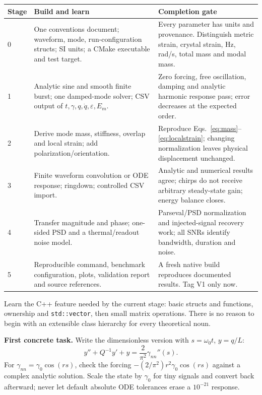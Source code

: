 \documentclass[a4paper,11pt]{article}
\newcommand{\eps}{\varepsilon}
\newcommand{\code}[1]{\texttt{#1}}
\begin{document}
\begin{longtable}{@{}P{17mm}P{62mm}P{74mm}@{}}
\toprule
Stage & Build and learn & Completion gate\\\midrule{} & One conventions document; waveform, mode, run-configuration structs; SI units; a CMake executable and test target. & Every parameter has units and provenance. Distinguish metric strain, crystal strain, Hz, rad/s, total mass and modal mass.\\
1 & Analytic sine and smooth finite burst; one damped-mode solver; CSV output of $t,\gamma,q,\dot q,\eps,E_m$. & Zero forcing, free oscillation, damping and analytic harmonic response pass; error decreases at the expected order.\\
2 & Derive mode mass, stiffness, overlap and local strain; add polarization/orientation. & Reproduce Eqs.~\eqref{eq:mass}--\eqref{eq:localstrain}; changing normalization leaves physical displacement unchanged.\\
3 & Finite waveform convolution or ODE response; ringdown; controlled CSV import. & Analytic and numerical results agree; chirps do not receive arbitrary steady-state gain; energy balance closes.\\
4 & Transfer magnitude and phase; one-sided PSD and a thermal/readout noise model. & Parseval/PSD normalization and injected-signal recovery work; all SNRs identify bandwidth, duration and noise.\\
5 & Reproducible command, benchmark configuration, plots, validation report and source references. & A fresh native build reproduces documented results. Tag V1 only now.\\
\bottomrule
\end{longtable}

Learn the C++ feature needed by the current stage: basic structs and functions, ownership and \code{std::vector}, then small matrix operations. There is no reason to begin with an extensible class hierarchy for every theoretical noun.

\textbf{First concrete task.} Write the dimensionless version with $s=\omega_0t$, $y=q/L$:
\begin{equation}
 y''+Q^{-1}y'+y=\frac2{\pi^2}\gamma_{nn}''(s).
\end{equation}
For $\gamma_{nn}=\gamma_0\cos(rs)$, check the forcing
$-(2/\pi^2)r^2\gamma_0\cos(rs)$ against a complex analytic solution. Scale the state by $\gamma_0$ for tiny signals and convert back afterward; never let default absolute ODE tolerances erase a $10^{-21}$ response.
\end{document}
